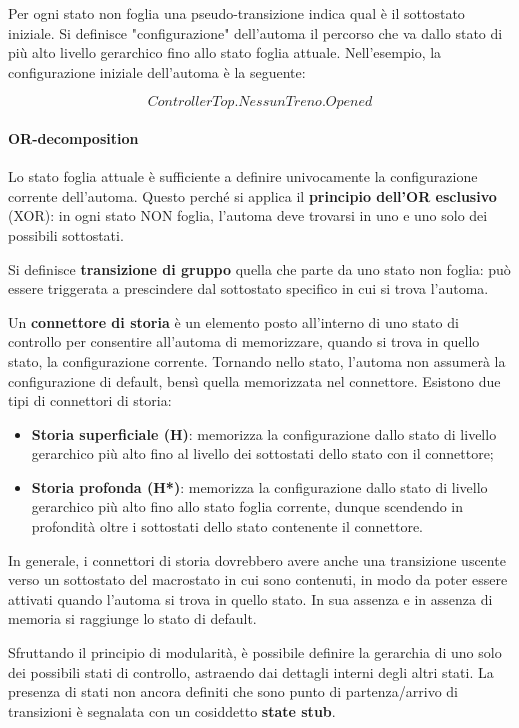 Per ogni stato non foglia una pseudo-transizione indica qual è il sottostato iniziale. Si definisce "configurazione" dell'automa il percorso che va dallo stato di più alto livello gerarchico fino allo stato foglia attuale. Nell'esempio, la configurazione iniziale dell'automa è la seguente:

$$ControllerTop.NessunTreno.Opened$$

\newpage

\paragraph{OR-decomposition} Lo stato foglia attuale è sufficiente a definire univocamente la configurazione corrente dell'automa. Questo perché si applica il \textbf{principio dell'OR esclusivo} (XOR): in ogni stato NON foglia, l'automa deve trovarsi in uno e uno solo dei possibili sottostati.

Si definisce \textbf{transizione di gruppo} quella che parte da uno stato non foglia: può essere triggerata a prescindere dal sottostato specifico in cui si trova l'automa. 

Un \textbf{connettore di storia} è un elemento posto all'interno di uno stato di controllo per consentire all'automa di memorizzare, quando si trova in quello stato, la configurazione corrente. Tornando nello stato, l'automa non assumerà la configurazione di default, bensì quella memorizzata nel connettore. Esistono due tipi di connettori di storia:
\begin{itemize}
    \item \textbf{Storia superficiale (H)}: memorizza la configurazione dallo stato di livello gerarchico più alto fino al livello dei sottostati dello stato con il connettore;
    \item \textbf{Storia profonda (H*)}: memorizza la configurazione dallo stato di livello gerarchico più alto fino allo stato foglia corrente, dunque scendendo in profondità oltre i sottostati dello stato contenente il connettore.
\end{itemize}

In generale, i connettori di storia dovrebbero avere anche una transizione uscente verso un sottostato del macrostato in cui sono contenuti, in modo da poter essere attivati quando l'automa si trova in quello stato. In sua assenza e in assenza di memoria si raggiunge lo stato di default.

Sfruttando il principio di modularità, è possibile definire la gerarchia di uno solo dei possibili stati di controllo, astraendo dai dettagli interni degli altri stati. La presenza di stati non ancora definiti che sono punto di partenza/arrivo di transizioni è segnalata con un cosiddetto \textbf{state stub}.

